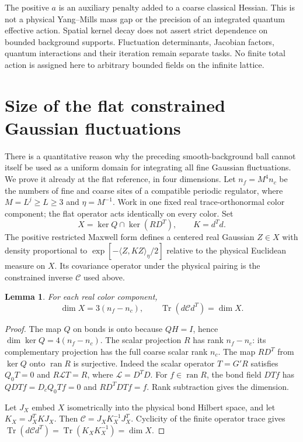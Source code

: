 \documentclass[11pt]{article}
\newtheorem{lemma}[theorem]{Lemma}
\theoremstyle{remark}
\begin{document}
The positive $a$ is an auxiliary penalty added to a coarse
classical Hessian. This is not a physical Yang--Mills mass gap
or the precision of an integrated quantum effective action.
Spatial kernel decay does not assert strict dependence on
bounded background supports. Fluctuation determinants,
Jacobian factors, quantum interactions and their iteration
remain separate tasks. No finite total action is assigned
here to arbitrary bounded fields on the infinite lattice.

\section{Size of the flat constrained Gaussian fluctuations}
\label{qg-section}

There is a quantitative reason why the preceding smooth-background
ball cannot itself be used as a uniform domain for integrating all
fine Gaussian fluctuations. We prove it already at the flat
reference, in four dimensions. Let $n_f=M^4n_c$ be the numbers
of fine and coarse sites of a compatible periodic regulator,
where $M=L^j\ge L\ge3$ and $\eta=M^{-1}$. Work in one fixed
real trace-orthonormal color component; the flat operator acts
identically on every color. Set
\[
 X=\ker Q\cap\ker(RD^T),\qquad K=d^Td.
\]
The positive restricted Maxwell form defines a centered real
Gaussian $Z\in X$ with density proportional to
$\exp[-\langle Z,KZ\rangle_\eta/2]$ relative to the
physical Euclidean measure on $X$. Its covariance operator
under the physical pairing is the constrained inverse
$\mathcal C$ used above.

\begin{lemma}\label{qg-dimension}
For each real color component,
\[
 \dim X=3(n_f-n_c),\qquad
 \operatorname{Tr}(d\mathcal C d^T)=\dim X.
\]
\end{lemma}
\begin{proof}
The map $Q$ on bonds is onto because $QH=I$, hence
$\dim\ker Q=4(n_f-n_c)$. The scalar projection $R$ has
rank $n_f-n_c$: its complementary projection has the full
coarse scalar rank $n_c$. The map $RD^T$ from $\ker Q$
onto $\operatorname{ran}R$ is surjective. Indeed the scalar
operator $T=G'R$ satisfies $Q_0T=0$ and $R\mathcal L T=R$,
where $\mathcal L=D^TD$. For $f\in\operatorname{ran}R$,
the bond field $DTf$ has $QDTf=D_cQ_0Tf=0$ and
$RD^TDTf=f$. Rank subtraction gives the dimension.

Let $J_X$ embed $X$ isometrically into the physical bond
Hilbert space, and let $K_X=J_X^TKJ_X$. Then
$\mathcal C=J_XK_X^{-1}J_X^T$. Cyclicity of the finite
operator trace gives
$\operatorname{Tr}(d\mathcal C d^T)
=\operatorname{Tr}(K_XK_X^{-1})=\dim X$.
\end{proof}
\end{document}
